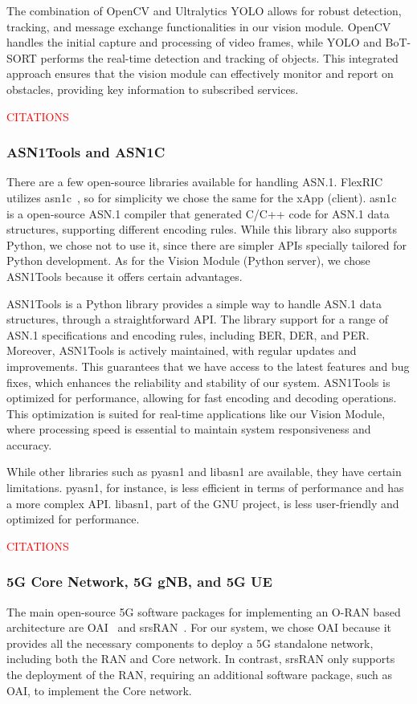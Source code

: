 The combination of OpenCV and Ultralytics YOLO allows for robust detection, tracking, and message exchange functionalities in our vision module.
OpenCV handles the initial capture and processing of video frames, while YOLO and BoT-SORT performs the real-time detection and tracking of objects.
This integrated approach ensures that the vision module can effectively monitor and report on obstacles, providing key information to subscribed services.

\textcolor{red}{CITATIONS}
\subsubsection{ASN1Tools and ASN1C}
There are a few open-source libraries available for handling ASN.1.
FlexRIC utilizes asn1c~\cite{}, so for simplicity we chose the same for the xApp (client).
asn1c~\cite[asn1c]{} is a open-source ASN.1 compiler that generated C/C++ code for ASN.1 data structures, supporting different encoding rules.
While this library also supports Python, we chose not to use it, since there are simpler APIs specially tailored for Python development.
As for the Vision Module (Python server), we chose ASN1Tools because it offers certain advantages.

ASN1Tools is a Python library provides a simple way to handle ASN.1 data structures, through a straightforward API\@.
The library support for a range of ASN.1 specifications and encoding rules, including BER, DER, and PER\@.
Moreover, ASN1Tools is actively maintained, with regular updates and improvements.
This guarantees that we have access to the latest features and bug fixes, which enhances the reliability and stability of our system.
ASN1Tools is optimized for performance, allowing for fast encoding and decoding operations.
This optimization is suited for real-time applications like our Vision Module, where processing speed is essential to maintain system responsiveness and accuracy.

While other libraries such as pyasn1 and libasn1 are available, they have certain limitations.
pyasn1, for instance, is less efficient in terms of performance and has a more complex API\@.
libasn1, part of the GNU project, is less user-friendly and optimized for performance.

\textcolor{red}{CITATIONS}
\subsubsection{5G Core Network, 5G gNB, and 5G UE}
The main open-source 5G software packages for implementing an O-RAN based architecture are OAI~\cite[]{} and srsRAN~\cite{}.
For our system, we chose OAI because it provides all the necessary components to deploy a 5G standalone network, including both the RAN and Core network.
In contrast, srsRAN only supports the deployment of the RAN, requiring an additional software package, such as OAI, to implement the Core network.


